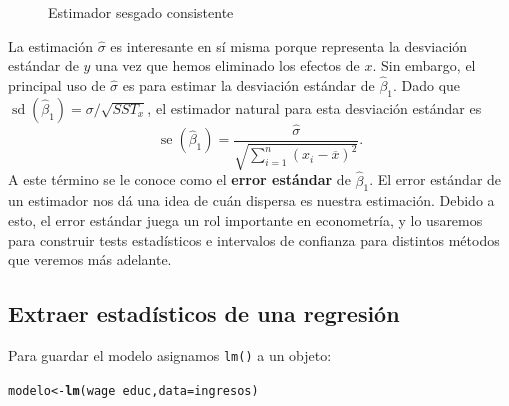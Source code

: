 \documentclass{report}\usepackage[]{graphicx}\usepackage[]{color}
\makeatletter
\newcommand{\hlopt}[1]{\textcolor[rgb]{0,0,0}{#1}}%
\newcommand{\hlstd}[1]{\textcolor[rgb]{0.345,0.345,0.345}{#1}}%
\newcommand{\hlkwb}[1]{\textcolor[rgb]{0.69,0.353,0.396}{#1}}%
\newcommand{\hlkwc}[1]{\textcolor[rgb]{0.333,0.667,0.333}{#1}}%
\newcommand{\hlkwd}[1]{\textcolor[rgb]{0.737,0.353,0.396}{\textbf{#1}}}%
\newenvironment{kframe}{%
 \def\at@end@of@kframe{}%
 \ifinner\ifhmode%
  \def\at@end@of@kframe{\end{minipage}}%
  \begin{minipage}{\columnwidth}%
 \fi\fi%
 \def\FrameCommand##1{\hskip\@totalleftmargin \hskip-\fboxsep
 \colorbox{shadecolor}{##1}\hskip-\fboxsep
     \hskip-\linewidth \hskip-\@totalleftmargin \hskip\columnwidth}%
 \MakeFramed {\advance\hsize-\width
   \@totalleftmargin\z@ \linewidth\hsize
   \@setminipage}}%
 {\par\unskip\endMakeFramed%
 \at@end@of@kframe}
\newenvironment{knitrout}{}{} %
\newcommand*{\kw}[1]{\textbf{#1}\index{#1}}
\newcommand{\sd}{\operatorname{sd}}
\newcommand{\se}{\operatorname{se}}
\makeatother
\begin{document}
\begin{figure}[htb]
  \centering
  \caption{Estimador sesgado consistente}
  \label{fig:estimador_sesgado_consistente}
\end{figure}%

La estimación $\hat\sigma$ es interesante en sí misma porque representa la desviación estándar de $y$ una vez que hemos eliminado los efectos de $x$.
Sin embargo, el principal uso de $\hat\sigma$ es para estimar la desviación estándar de $\hat\beta_1$.
Dado que $\sd(\hat\beta_1) = \sigma / \sqrt{SST_x}$, el estimador natural para esta desviación estándar es
\begin{equation}
\se(\hat\beta_1) = \frac{\hat\sigma}{\sqrt{\sum_{i=1}^n(x_i - \overline x)^2}}.
\end{equation}
A este término se le conoce como el \kw{error estándar} de $\hat\beta_1$.
El error estándar de un estimador nos dá una idea de cuán dispersa es nuestra estimación. Debido a esto, el error estándar juega un rol importante en econometría, y lo usaremos para construir tests estadísticos e intervalos de confianza para distintos métodos que veremos más adelante.


\hrulefill

\subsection{Extraer estadísticos de una regresión}

Para guardar el modelo asignamos \verb|lm()| a un objeto:

\begin{knitrout}
\color{fgcolor}\begin{kframe}
\begin{alltt}
\hlstd{modelo} \hlkwb{<-} \hlkwd{lm}\hlstd{(wage} \hlopt{~} \hlstd{educ,} \hlkwc{data} \hlstd{= ingresos)}
\end{alltt}
\end{kframe}
\end{knitrout}
\end{document}
